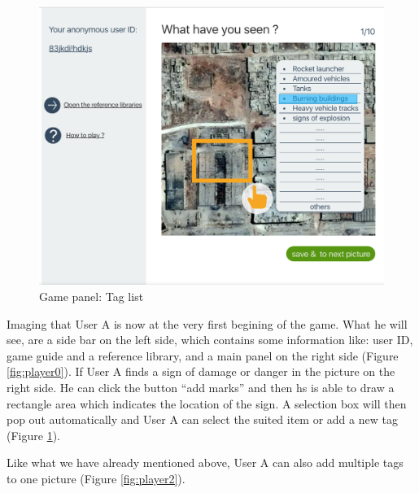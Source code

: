       \noindent\begin{minipage}{.45\textwidth}
      \begin{figure}[H]
      \centering
      \includegraphics[width=\textwidth]{figures/function-player-1}
      \caption{Game panel: Tag list}
      \label{fig:player1}
      \end{figure}
      \end{minipage}\hfill

      Imaging that User A is now at the very first begining of the game.
      What he will see,
      are a side bar on the left side,
      which contains some information like:
      user ID,
      game guide and a reference library,
      and a main panel on the right side (Figure \ref{fig:player0}).
      If User A finds a sign of damage or danger in the picture on the right side.
      He can click the button ``add marks'' and then hs is able to draw a rectangle area which indicates the location of the sign.
      A selection box will then pop out automatically and User A can select the suited item or add a new tag (Figure \ref{fig:player1}).

      Like what we have already mentioned above,
      User A can also add multiple tags to one picture (Figure \ref{fig:player2}).

